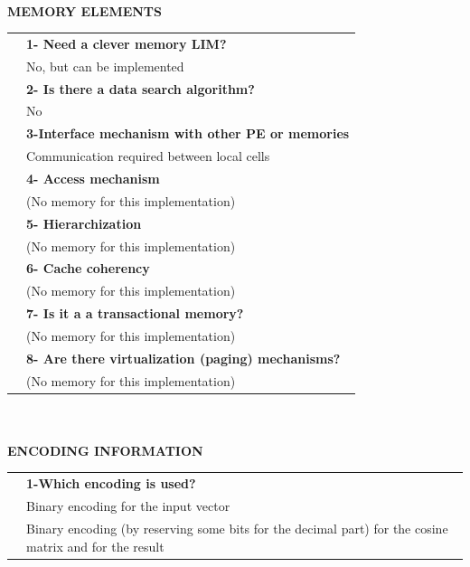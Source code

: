    {\large \textbf{\qquad }}\vspace{10pt}\\
   {\large \textbf{MEMORY ELEMENTS}}\vspace{10pt}\\\begin{tabular}{ p{0.2cm} p{14.5cm}}
   	&\textbf{1- Need a clever memory LIM?}\\
   	&	No, but can be implemented\vspace{7pt}\\
   	&\textbf{2- Is there a data search algorithm?}\\
   	&	No\vspace{7pt}\\
   	&\textbf{	3-Interface mechanism with other PE or memories}\\
   	&	Communication required between local cells\vspace{7pt}\\
   	&	\textbf{4- Access mechanism}\\
   	&	(No memory for this implementation)\vspace{7pt}\\
   	&	\textbf{5- Hierarchization} \\
   	&	(No memory for this implementation)\vspace{7pt}\\
   	&\textbf{	6- Cache coherency} \\
   	&	(No memory for this implementation)\vspace{7pt}\\
   	&\textbf{	7- Is it a a transactional memory?}\\
   	&	(No memory for this implementation)\vspace{7pt}\\
   	&\textbf{	8- Are there virtualization (paging) mechanisms?}\\
   	&	(No memory for this implementation)\end{tabular}\vspace{14pt}\\
   \vspace{10pt}\\
   {\large\textbf{ENCODING INFORMATION}}\vspace{10pt}\\
   \begin{tabular}{ p{0.2cm} p{14.5cm}}
   	&\textbf{1-Which encoding is used?}\\
   	&Binary encoding for the input vector\\
&Binary encoding (by reserving some bits for the decimal part) for the cosine matrix and for the result\\
   \end{tabular}
